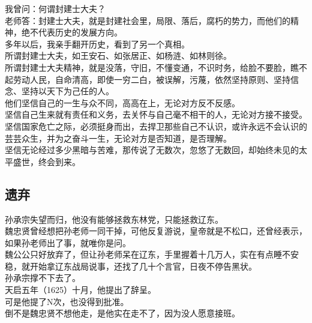 \begin{multicols}{\theparacolNo}
我曾问：何谓封建士大夫？\\

老师答：封建士大夫，就是封建社会里，局限、落后，腐朽的势力，而他们的精神，绝不代表历史的发展方向。\\

多年以后，我亲手翻开历史，看到了另一个真相。\\

所谓封建士大夫，如王安石、如张居正、如杨涟、如林则徐。\\

所谓封建士大夫精神，就是没落，守旧，不懂变通，不识时务，给脸不要脸，瞧不起劳动人民，自命清高，即使一穷二白，被误解，污蔑，依然坚持原则、坚持信念、坚持以天下为己任的人。\\

他们坚信自己的一生与众不同，高高在上，无论对方反不反感。\\

坚信自己生来就有责任和义务，去关怀与自己毫不相干的人，无论对方接不接受。\\

坚信国家危亡之际，必须挺身而出，去捍卫那些自己不认识，或许永远不会认识的芸芸众生，并为之奋斗一生，无论对方是否知道，是否理解。\\

坚信无论经过多少黑暗与苦难，那传说了无数次，忽悠了无数回，却始终未见的太平盛世，终会到来。\\

\subsection{遗弃}
孙承宗失望而归，他没有能够拯救东林党，只能拯救辽东。\\

魏忠贤曾经想把孙老师一同干掉，可他反复游说，皇帝就是不松口，还曾经表示，如果孙老师出了事，就唯你是问。\\

魏公公只好放弃了，但让孙老师呆在辽东，手里握着十几万人，实在有点睡不安稳，就开始拿辽东战局说事，还找了几十个言官，日夜不停告黑状。\\

孙承宗撑不下去了。\\

天启五年（1625）十月，他提出了辞呈。\\

可是他提了N次，也没得到批准。\\

倒不是魏忠贤不想他走，是他实在走不了，因为没人愿意接班。\\


\end{multicols}
